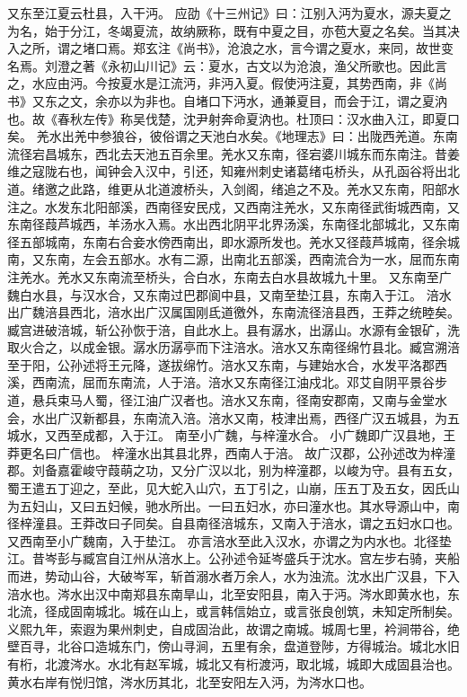 \documentclass[12pt,UTF8]{ctexbook}
\begin{document}
又东至江夏云杜县，入干沔。
应劭《十三州记》曰：江别入沔为夏水，源夫夏之为名，始于分江，冬竭夏流，故纳厥称，既有中夏之目，亦苞大夏之名矣。当其决入之所，谓之堵口焉。郑玄注《尚书》，沧浪之水，言今谓之夏水，来同，故世变名焉。刘澄之著《永初山川记》云：夏水，古文以为沧浪，渔父所歌也。因此言之，水应由沔。今按夏水是江流沔，非沔入夏。假使沔注夏，其势西南，非《尚书》又东之文，余亦以为非也。自堵口下沔水，通兼夏目，而会于江，谓之夏汭也。故《春秋左传》称吴伐楚，沈尹射奔命夏汭也。杜顶曰：汉水曲入江，即夏口矣。
羌水出羌中参狼谷，彼俗谓之天池白水矣。《地理志》曰：出陇西羌道。东南流径宕昌城东，西北去天池五百余里。羌水又东南，径宕婆川城东而东南注。昔姜维之寇陇右也，闻钟会入汉中，引还，知雍州刺史诸葛绪屯桥头，从孔函谷将出北道。绪邀之此路，维更从北道渡桥头，入剑阁，绪追之不及。羌水又东南，阳部水注之。水发东北阳部溪，西南径安民戍，又西南注羌水，又东南径武街城西南，又东南径葭芦城西，羊汤水入焉。水出西北阴平北界汤溪，东南径北部城北，又东南径五部城南，东南右合妾水傍西南出，即水源所发也。羌水又径葭芦城南，径余城南，又东南，左会五部水。水有二源，出南北五部溪，西南流合为一水，屈而东南注羌水。羌水又东南流至桥头，合白水，东南去白水县故城九十里。
又东南至广魏白水县，与汉水合，又东南过巴郡阆中县，又南至垫江县，东南入于江。
涪水出广魏涪县西北，涪水出广汉属国刚氐道徼外，东南流径涪县西，王莽之统睦矣。臧宫进破涪城，斩公孙恢于涪，自此水上。县有潺水，出潺山。水源有金银矿，洗取火合之，以成金银。潺水历潺亭而下注涪水。涪水又东南径绵竹县北。臧宫溯涪至于阳，公孙述将王元降，遂拔绵竹。涪水又东南，与建始水合，水发平洛郡西溪，西南流，屈而东南流，人于涪。涪水又东南径江油戍北。邓艾自阴平景谷步道，悬兵束马人蜀，径江油广汉者也。涪水又东南，径南安郡南，又南与金堂水会，水出广汉新都县，东南流入涪。涪水又南，枝津出焉，西径广汉五城县，为五城水，又西至成都，入于江。
南至小广魏，与梓潼水合。
小广魏即广汉县地，王莽更名曰广信也。
梓潼水出其县北界，西南人于涪。
故广汉郡，公孙述改为梓潼郡。刘备嘉霍峻守葭萌之功，又分广汉以北，别为梓潼郡，以峻为守。县有五女，蜀王遣五丁迎之，至此，见大蛇入山穴，五丁引之，山崩，压五丁及五女，因氏山为五妇山，又曰五妇候，驰水所出。一曰五妇水，亦曰潼水也。其水导源山中，南径梓潼县。王莽改曰子同矣。自县南径涪城东，又南入于涪水，谓之五妇水口也。
又西南至小广魏南，入于垫江。
亦言涪水至此入汉水，亦谓之为内水也。北径垫江。昔岑彭与臧宫自江州从涪水上。公孙述令延岑盛兵于沈水。宫左步右骑，夹船而进，势动山谷，大破岑军，斩首溺水者万余人，水为浊流。沈水出广汉县，下入涪水也。涔水出汉中南郑县东南旱山，北至安阳县，南入于沔。涔水即黄水也，东北流，径成固南城北。城在山上，或言韩信始立，或言张良创筑，未知定所制矣。义熙九年，索遐为果州刺史，自成固治此，故谓之南城。城周七里，衿涧带谷，绝壁百寻，北谷口造城东门，傍山寻涧，五里有余，盘道登陟，方得城治。城北水旧有桁，北渡涔水。水北有赵军城，城北又有桁渡沔，取北城，城即大成固县治也。黄水右岸有悦归馆，涔水历其北，北至安阳左入沔，为涔水口也。
\end{document}

